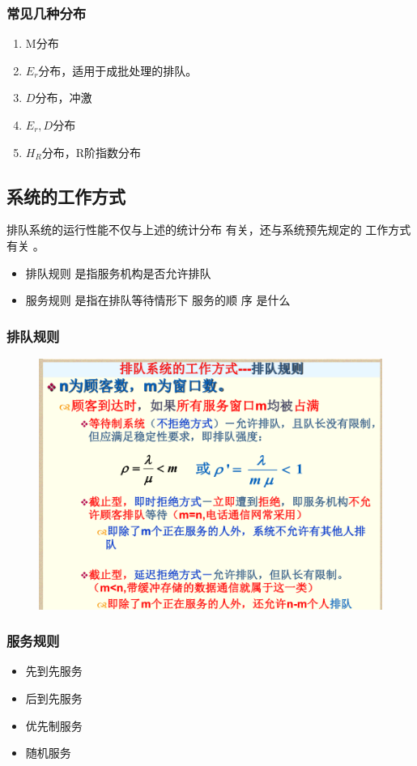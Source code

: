 \documentclass{article}
\begin{document}
	\subsubsection{常见几种分布}
	\begin{enumerate}
		\item M分布
		\item $E_r$分布，适用于成批处理的排队。
		\item $D$分布，冲激
		\item $E_r,D$分布
		\item $H_R$分布，R阶指数分布
	\end{enumerate}
	\subsection{系统的工作方式}
	 排队系统的运行性能不仅与上述的统计分布
	有关，还与系统预先规定的 工作方式有关 。
	\begin{itemize}
		\item 排队规则 是指服务机构是否允许排队
		\item  服务规则 是指在排队等待情形下 服务的顺
		序 是什么
	\end{itemize}
	\subsubsection{排队规则}
	\begin{figure}[H]
		\centering
		\includegraphics[width=0.5\linewidth]{figures/prove_3}
		\caption{}
		\label{fig:prove3}
	\end{figure}
	\subsubsection{服务规则}
	\begin{itemize}
		\item 先到先服务
		\item 后到先服务
		\item 优先制服务
		\item 随机服务
	\end{itemize}
\end{document}
